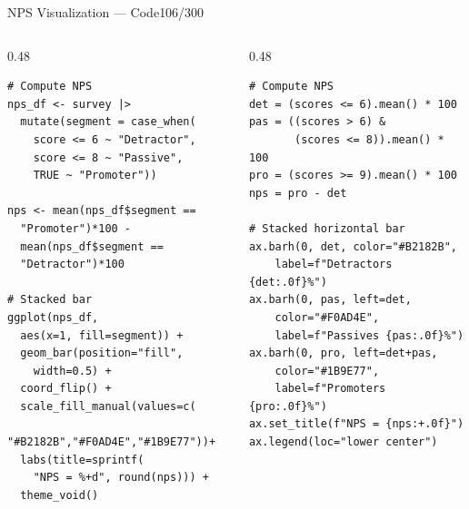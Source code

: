 \documentclass[10pt]{beamer}
\newcommand{\smark}[1]{\hfill{\scriptsize\color{codegray}#1}}
\begin{document}
\begin{frame}[fragile]{NPS Visualization --- Code}\smark{106/300}
\begin{columns}[T]
\begin{column}{0.48\textwidth}
\begin{lstlisting}[style=Rstyle]
# Compute NPS
nps_df <- survey |>
  mutate(segment = case_when(
    score <= 6 ~ "Detractor",
    score <= 8 ~ "Passive",
    TRUE ~ "Promoter"))

nps <- mean(nps_df$segment ==
  "Promoter")*100 -
  mean(nps_df$segment ==
  "Detractor")*100

# Stacked bar
ggplot(nps_df,
  aes(x=1, fill=segment)) +
  geom_bar(position="fill",
    width=0.5) +
  coord_flip() +
  scale_fill_manual(values=c(
    "#B2182B","#F0AD4E","#1B9E77"))+
  labs(title=sprintf(
    "NPS = %+d", round(nps))) +
  theme_void()
\end{lstlisting}
\end{column}
\begin{column}{0.48\textwidth}
\begin{lstlisting}[style=Pystyle]
# Compute NPS
det = (scores <= 6).mean() * 100
pas = ((scores > 6) &
       (scores <= 8)).mean() * 100
pro = (scores >= 9).mean() * 100
nps = pro - det

# Stacked horizontal bar
ax.barh(0, det, color="#B2182B",
    label=f"Detractors {det:.0f}%")
ax.barh(0, pas, left=det,
    color="#F0AD4E",
    label=f"Passives {pas:.0f}%")
ax.barh(0, pro, left=det+pas,
    color="#1B9E77",
    label=f"Promoters {pro:.0f}%")
ax.set_title(f"NPS = {nps:+.0f}")
ax.legend(loc="lower center")
\end{lstlisting}
\end{column}
\end{columns}
\end{frame}
\end{document}
